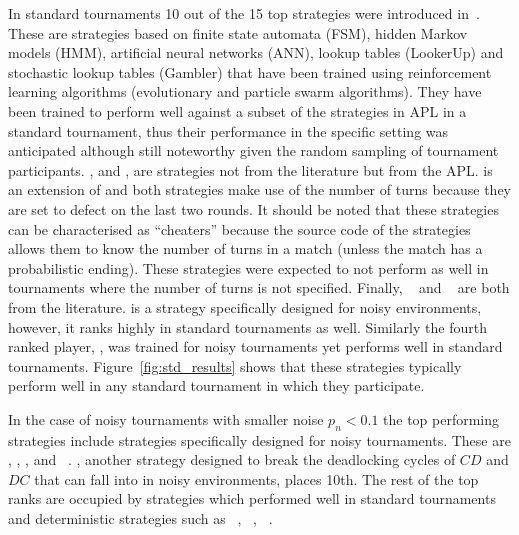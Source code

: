 In standard tournaments 10 out of the 15 top strategies were introduced
in~\cite{Harper2017}. These are strategies based on finite state automata (FSM),
hidden Markov models (HMM), artificial neural networks (ANN), lookup tables
(LookerUp) and stochastic lookup tables (Gambler) that have been trained using
reinforcement learning algorithms (evolutionary and particle swarm algorithms).
They have been trained to perform well against a subset of the strategies
in APL in a standard tournament, thus their performance in the
specific setting was anticipated although still noteworthy given the random
sampling of tournament participants. \DoubleCrosser, \BackStabber and \FoolMeOnce, are
strategies not from the literature but from the APL. \DoubleCrosser is an extension
of \BackStabber and both strategies make use of the number of turns because they are
set to defect on the last two rounds. It should be noted that these
strategies can be characterised as ``cheaters'' because the source code of the strategies
allows them to know the number of turns in a match (unless the match has a probabilistic ending). These strategies were expected to not perform as well in
tournaments where the number of turns is not specified. Finally, \WinnerTwelve~\cite{mathieu2017}
and \DBS~\cite{Au2006} are both from the literature.
\DBS is a strategy specifically designed for noisy environments, however, it ranks
highly in standard tournaments as well. Similarly the fourth ranked player,
\EvolvedFSMSixTeenNoiseZeroFive, was
trained for noisy tournaments yet performs well in standard tournaments.
Figure~\ref{fig:std_results} shows that these strategies typically perform
well in any standard tournament in which they participate.

In the case of noisy tournaments with smaller noise \(p_n < 0.1\) the top
performing strategies
include strategies specifically designed for noisy tournaments. These are \DBS,
\EvolvedFSMSixTeenNoiseZeroFive, \EvolvedANNFiveNoiseZeroFive, \PSOGamblerTwoTwoTwoNoiseZeroFive and
\OmegaTFT~\cite{kendall2007iterated}. \OmegaTFT, another strategy designed
to break the deadlocking cycles of \(CD\) and \(DC\) that \TitForTat can fall into in noisy
environments, places 10th. The rest of the top ranks are
occupied by strategies which performed well in standard tournaments and
deterministic strategies such as \SpitefulTitForTat~\cite{prison},
\LevelPunisher~\cite{Eckhart2015}, \EugineNier~\cite{lesswrong}.

